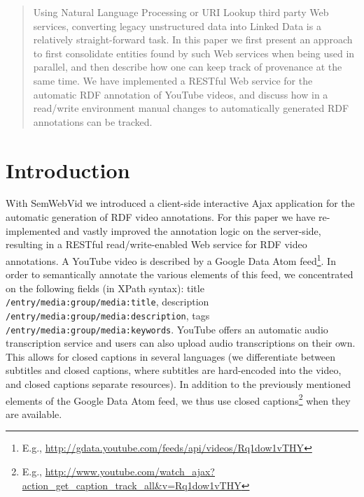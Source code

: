 \documentclass{acm_proc_article-sp}
\begin{document}
\maketitle
\begin{abstract}
Using Natural Language Processing or URI Lookup third party Web services, converting legacy unstructured data into Linked Data is a relatively straight-forward task. In this paper we first present an approach to first consolidate entities found by such Web services when being used in parallel, and then describe how one can keep track of provenance at the same time. We have implemented a RESTful Web service for the automatic RDF annotation of YouTube videos, and discuss how in a read/write environment manual changes to automatically generated RDF annotations can be tracked. 
\end{abstract}




\section{Introduction}\label{sec:introduction}
With SemWebVid \cite{Steiner:SemWebVid} we introduced a client-side interactive Ajax application for the automatic generation of RDF video annotations. For this paper we have re-implemented and vastly improved the annotation logic on the server-side, resulting in a RESTful read/write-enabled Web service for RDF video annotations. A YouTube video is described by a Google Data Atom feed\footnote{E.g., \url{http://gdata.youtube.com/feeds/api/videos/Rq1dow1vTHY}}. In order to semantically annotate the various elements of this feed, we concentrated on the following fields (in XPath syntax): title \texttt{/entry/media:group/media:title}, description \texttt{/entry/\-media:\-group/media:description}, tags \texttt{/entry/media:\-group/media:\-keywords}. YouTube offers an automatic audio transcription service and users can also upload audio transcriptions on their own. This allows for closed captions in several languages (we differentiate between subtitles and closed captions, where subtitles are hard-encoded into the video, and closed captions separate resources). In addition to the previously mentioned elements of the Google Data Atom feed, we thus use closed captions\footnote{E.g., \url{http://www.youtube.com/watch_ajax?action_get_caption_track_all&v=Rq1dow1vTHY}} when they are available.
\end{document}
